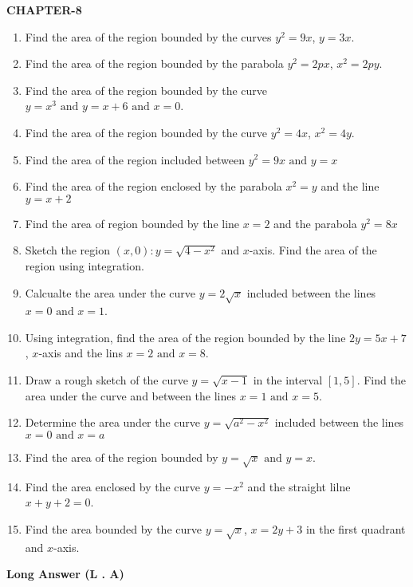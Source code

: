 \documentclass[12pt]{article}
\begin{document}
\begin{center}
\textbf{CHAPTER-8}
\end{center}

\begin{enumerate}
\item Find the area of the region bounded by the curves $y^2 = 9x$, $y = 3x$.
\item Find the area of the region bounded by the parabola $y^2 = 2px$, $x^2 = 2py$.
\item Find the area of the region bounded by the curve $y = x^3\text{ and }y = x + 6\text{ and }x = 0$.
\item Find the area of the region bounded by the curve $y^2 = 4x$, $x^2 = 4y$.
\item Find the area of the region included between $y^2 = 9x\text{ and }y =x$
\item Find the area of the region enclosed by the parabola $x^2 = y$ and the line $y = x + 2$
\item Find the area of region bounded by the line $x = 2$ and the parabola $y^2 = 8x$
\item Sketch the region ${(x,0) : y = \sqrt{4 - x^2}}$ and $x$-axis. Find the area of the region using integration.
\item Calcualte the area under the curve $y = 2\sqrt{x}$ included between the lines $x = 0\text{ and }x = 1$.
\item Using integration, find the area of the region bounded by the line $2y = 5x + 7$, $x$-axis and the lins $x = 2\text{ and }x =8$.
\item Draw a rough sketch of the curve $y = \sqrt{x - 1}$ in the interval $[1, 5]$. Find the area under the curve and between the lines $x = 1\text{ and }x = 5$.
\item Determine the area under the curve $y = \sqrt{a^2 - x^2}$ included between the lines $x = 0\text{ and }x = a$
\item Find the area of the region bounded by $y = \sqrt{x}\text{ and }y = x$.
\item Find the area enclosed by the curve $y = - x^2$ and the straight lilne $x + y + 2 = 0$.
\item Find the area bounded by the curve $y = \sqrt{x}$, $x = 2y + 3$ in the first quadrant and $x$-axis.
\end{enumerate}
\textbf{Long Answer (L . A)}
\end{document}
